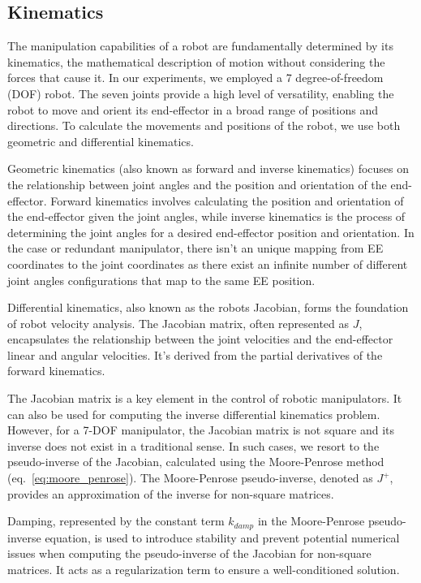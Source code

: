 \documentclass[a4paper]{article}
\begin{document}
\subsection{Kinematics}

The manipulation capabilities of a robot are fundamentally determined by its kinematics, the mathematical description of motion without considering the forces that cause it. In our experiments, we employed a 7 degree-of-freedom (DOF) robot. The seven joints provide a high level of versatility, enabling the robot to move and orient its end-effector in a broad range of positions and directions. To calculate the movements and positions of the robot, we use both geometric and differential kinematics.

Geometric kinematics (also known as forward and inverse kinematics) focuses on the relationship between joint angles and the position and orientation of the end-effector. Forward kinematics involves calculating the position and orientation of the end-effector given the joint angles, while inverse kinematics is the process of determining the joint angles for a desired end-effector position and orientation. In the case or redundant manipulator, there isn't an unique mapping from EE coordinates to the joint coordinates as there exist an infinite number of different joint angles configurations that map to the same EE position.

Differential kinematics, also known as the robots Jacobian, forms the foundation of robot velocity analysis. The Jacobian matrix, often represented as $J$, encapsulates the relationship between the joint velocities and the end-effector linear and angular velocities. It's derived from the partial derivatives of the forward kinematics.

The Jacobian matrix is a key element in the control of robotic manipulators. It can also be used for computing the inverse differential kinematics problem. However, for a 7-DOF manipulator, the Jacobian matrix is not square and its inverse does not exist in a traditional sense. In such cases, we resort to the pseudo-inverse of the Jacobian, calculated using the Moore-Penrose method (eq.~\ref{eq:moore_penrose}). The Moore-Penrose pseudo-inverse, denoted as $J^+$, provides an approximation of the inverse for non-square matrices. 

Damping, represented by the constant term $k_{damp}$ in the Moore-Penrose pseudo-inverse equation, is used to introduce stability and prevent potential numerical issues when computing the pseudo-inverse of the Jacobian for non-square matrices. It acts as a regularization term to ensure a well-conditioned solution.
\end{document}
